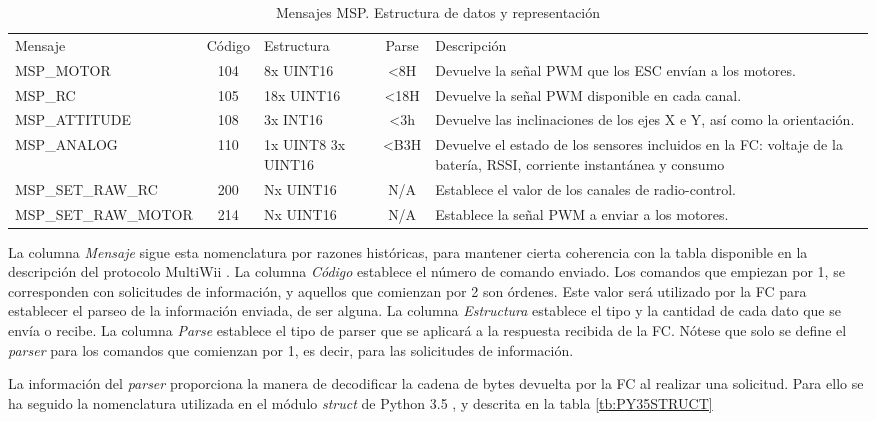 \begin{landscape}
\begin{table}
	\begin{center}	
		\begin{tabular}{m{5cm}  c  m{4cm}  c  m{7cm}}\hline
			\toprule
			Mensaje & Código & Estructura & Parse & Descripción\\
			\otoprule
			MSP\_MOTOR & 104 & 8x UINT16 & <8H & Devuelve la señal PWM que los ESC envían a los motores.\\
			MSP\_RC & 105 & 18x UINT16 & <18H & Devuelve la señal PWM disponible en cada canal.\\
			MSP\_ATTITUDE & 108  & 3x INT16 & <3h & Devuelve las inclinaciones de los ejes X e Y, así como la orientación.\\
			MSP\_ANALOG & 110 & 1x UINT8 3x UINT16 & <B3H & Devuelve el estado de los sensores incluidos en la FC: voltaje de la batería, RSSI, corriente instantánea y consumo\\
			MSP\_SET\_RAW\_RC & 200 & Nx UINT16 & N/A & Establece el valor de los canales de radio-control.\\
			MSP\_SET\_RAW\_MOTOR & 214 & Nx UINT16 & N/A & Establece la señal PWM a enviar a los motores.\\
			\bottomrule
		\end{tabular}
		\caption{Mensajes MSP. Estructura de datos y representación}
		\label{tb:MSP_MESSAGES}
	\end{center}
\end{table} 
La columna \textit{Mensaje} sigue esta nomenclatura por razones históricas, para mantener cierta coherencia con la tabla disponible en la descripción del protocolo MultiWii \citep{wiki:MSPDefinition}. La columna \textit{Código} establece el número de comando enviado. Los comandos que empiezan por 1, se corresponden con solicitudes de información, y aquellos que comienzan por 2 son órdenes. Este valor será utilizado por la FC para establecer el parseo de la información enviada, de ser alguna. La columna \textit{Estructura} establece el tipo y la cantidad de cada dato que se envía o recibe. La columna \textit{Parse} establece el tipo de parser que se aplicará a la respuesta recibida de la FC. Nótese que solo se define el \emph{parser} para los comandos que comienzan por 1, es decir, para las solicitudes de información.
\end{landscape}




La información del \emph{parser} proporciona la manera de decodificar la cadena de bytes devuelta por la FC al realizar una solicitud. Para ello se ha seguido la nomenclatura utilizada en el módulo \textit{struct} de Python 3.5 \citep{wiki:PythonStruct}, y  descrita en la tabla \ref{tb:PY35STRUCT}

